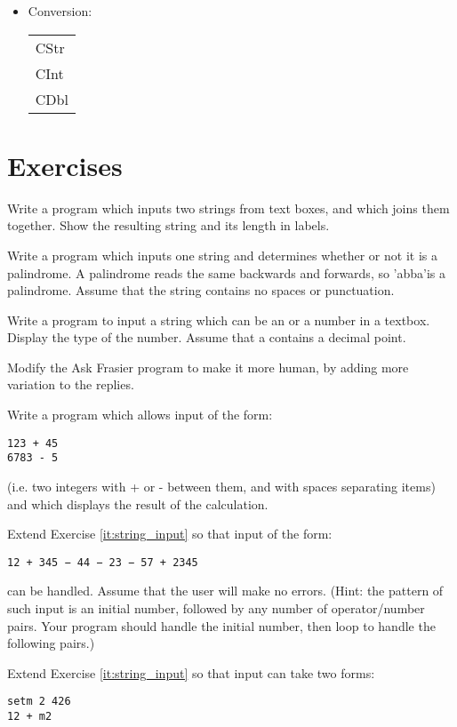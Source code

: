 \begin{itemize}
\begin{itemize}
					\item	Conversion:
		
						\begin{tabular}{>{\collectcell\keyword}l<{\endcollectcell} }
							CStr\\
							CInt \\
							CDbl\\
						\end{tabular}
				\end{itemize}
		\end{itemize}


	\section{Exercises}
		\begin{EXE}
			\item	Write a program which inputs two strings from text boxes, and which joins them together. Show the resulting string and its length in labels.
			\item	Write a program which inputs one string and determines whether or not it is a palindrome. A palindrome reads the same backwards and forwards, so 'abba'is a palindrome. Assume that the string contains no spaces or punctuation.
			\item	Write a program to input a string which can be an  or a  number in a textbox. Display the type of the number. Assume that a  contains a decimal point.
			\item Modify the Ask Frasier program to make it more human, by adding more variation to the replies.
			\item	\label{it:string_input} Write a program which allows input of the form:
				\begin{lstlisting}
123 + 45
6783 - 5
				\end{lstlisting}
				(i.e. two integers with + or - between them, and with spaces separating items) and which displays the result of the calculation.
			\item Extend Exercise \ref{it:string_input} so that input of the form:
				\begin{lstlisting}
12 + 345 − 44 − 23 − 57 + 2345
				\end{lstlisting}
				can be handled. Assume that the user will make no errors.
				(Hint: the pattern of such input is an initial number, followed by any number of operator/number pairs. Your program should handle the initial number, then loop to handle the following pairs.)
			\item Extend Exercise \ref{it:string_input} so that input can take two forms:
				\begin{lstlisting}
setm 2 426
12 + m2
				\end{lstlisting}


\end{EXE}
